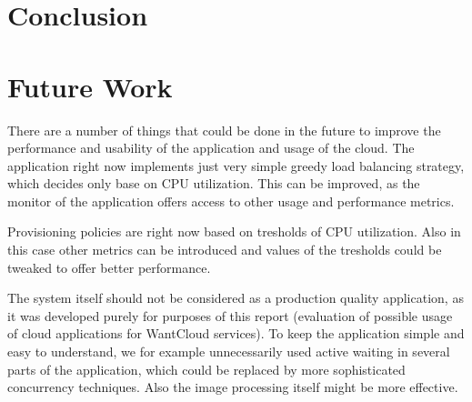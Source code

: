 \section{Conclusion}
\label{con}

\section{Future Work}
There are a number of things that could be done in the future to improve the performance and usability of the application and usage of the cloud. The application right now implements just very simple greedy load balancing strategy, which decides only base on CPU utilization. This can be improved, as the monitor of the application offers access to other usage and performance metrics.

Provisioning policies are right now based on tresholds of CPU utilization. Also in this case other metrics can be introduced and values of the tresholds could be tweaked to offer better performance.

The system itself should not be considered as a production quality application, as it was developed purely for purposes of this report (evaluation of possible usage of cloud applications for WantCloud services). To keep the application simple and easy to understand, we for example unnecessarily used active waiting in several parts of the application, which could be replaced by more sophisticated concurrency techniques. Also the image processing itself might be more effective.